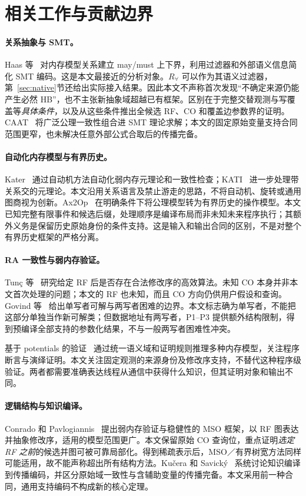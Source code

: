 \section{相关工作与贡献边界}\label{sec:related}
\paragraph{关系抽象与 SMT。}
Haas 等~\cite{haas2023} 对内存模型关系建立 may/must 上下界，利用过滤器和外部语义信息简化 SMT 编码。这是本文最接近的分析对象。$R_\forall$ 可以作为其语义过滤器，第~\ref{sec:native}节还给出实际接入结果。因此本文不声称首次发现“不确定来源仍能产生必然 HB”，也不主张新抽象域超越已有框架。区别在于完整交替观测与写覆盖等\emph{具体条件}，以及从这些条件推出全候选 RF、CO 和覆盖边参数界的证明。CAAT~\cite{haas2022} 将广泛公理一致性组合进 SMT 理论求解；本文的固定原始变量支持合同范围更窄，也未解决任意外部公式合取后的传播完备。

\paragraph{自动化内存模型与有界历史。}
Kater~\cite{kater2023} 通过自动机方法自动化弱内存元理论和一致性检查；KATI~\cite{kati2024} 进一步处理带关系交的元理论。本文沿用关系语言及禁止游走的思路，不将自动机、旋转或通用图商视为创新。Ax2Op~\cite{godbole2022} 在明确条件下将公理模型转为有界历史的操作模型。本文已知完整有限事件和候选后缀，处理顺序是编译布局而非未知未来程序执行；其额外义务是保留历史原始身份的条件支持。这是输入和输出合同的区别，不是对整个有界历史框架的严格分离。

\paragraph{RA 一致性与弱内存验证。}
Tunç 等~\cite{tunc2023} 研究给定 RF 后是否存在合法修改序的高效算法。未知 CO 本身并非本文首次处理的问题；本文的 RF 也未知，而且 CO 方向仍供用户假设和查询。Govind 等~\cite{govind2026} 给出单写者可解与两写者困难的边界。本文标志确为单写者，不能把这部分单独当作新可解类；但数据地址有两写者，P1--P3 提供额外结构限制，得到预编译全部支持的参数化结果，不与一般两写者困难性冲突。

基于 potentials 的验证~\cite{bargmann2024} 通过统一语义域和证明规则推理多种内存模型，关注程序断言与演绎证明。本文关注固定观测的来源身份及修改序支持，不替代这种程序级验证。两者都需要准确表达线程从通信中获得什么知识，但其证明对象和输出不同。

\paragraph{逻辑结构与知识编译。}
Conrado 和 Pavlogiannis~\cite{conrado2026} 提出弱内存验证与稳健性的 MSO 框架，以 RF 图表达并抽象修改序，适用的模型范围更广。本文保留原始 CO 查询位，重点证明\emph{选定 RF 之前}的候选并图可被可靠局部化。得到稀疏表示后，MSO／有界树宽方法同样可能适用，故不能声称超出所有结构方法。Kučera 和 Savický~\cite{kucera2021} 系统讨论知识编译到传播编码，并区分原始域一致性与含辅助变量的传播完备。本文采用前一种合同，通用支持编码不构成新的核心定理。

